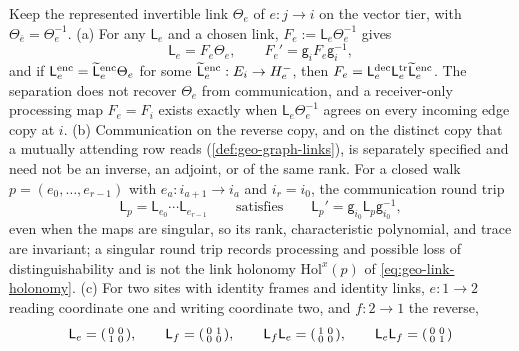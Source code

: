 Keep the represented invertible link \(\Theta_e\) of \(e:j\to i\) on the vector
tier, with \(\Theta_{\bar e}=\Theta_e^{-1}\). (a) For any \(\mathsf L_e\) and a
chosen link, \(F_e:=\mathsf L_e\Theta_e^{-1}\) gives
\begin{equation}
\mathsf L_e=F_e\Theta_e,
\qquad
F_e'=\mathsf g_iF_e\mathsf g_i^{-1},
\label{eq:geo-selective-processing-connection}
\end{equation}
and if \(\mathsf L^{\rm enc}_e=\widetilde{\mathsf L}^{\rm enc}_e\Theta_e\) for
some \(\widetilde{\mathsf L}^{\rm enc}_e:E_i\to H_e^-\), then
\(F_e=\mathsf L^{\rm dec}_e\mathsf L^{\rm tr}_e\widetilde{\mathsf L}^{\rm enc}_e\).
The separation does not recover \(\Theta_e\) from communication, and a
receiver-only processing map \(F_e=F_i\) exists exactly when
\(\mathsf L_e\Theta_e^{-1}\) agrees on every incoming edge copy at \(i\). (b)
Communication on the reverse copy, and on the distinct copy that a mutually
attending row reads (\cref{def:geo-graph-links}), is separately specified and
need not be an inverse, an adjoint, or of the same rank. For a closed walk
\(p=(e_0,\ldots,e_{r-1})\) with \(e_a:i_{a+1}\to i_a\) and \(i_r=i_0\), the
communication round trip
\begin{equation}
\mathsf L_p=\mathsf L_{e_0}\cdots\mathsf L_{e_{r-1}}
\qquad\text{satisfies}\qquad
\mathsf L_p'=\mathsf g_{i_0}\mathsf L_p\mathsf g_{i_0}^{-1},
\label{eq:geo-selective-loop}
\end{equation}
even when the maps are singular, so its rank, characteristic polynomial, and
trace are invariant; a singular round trip records processing and possible
loss of distinguishability and is not the link holonomy
\(\mathrm{Hol}^x(p)\) of \eqref{eq:geo-link-holonomy}. (c) For two sites with
identity frames and identity links, \(e:1\to2\) reading coordinate one and
writing coordinate two, and \(f:2\to1\) the reverse,
\begin{equation}
\mathsf L_e=\begin{psmallmatrix}0&0\\1&0\end{psmallmatrix},\qquad
\mathsf L_f=\begin{psmallmatrix}0&1\\0&0\end{psmallmatrix},\qquad
\mathsf L_f\mathsf L_e=\begin{psmallmatrix}1&0\\0&0\end{psmallmatrix},\qquad
\mathsf L_e\mathsf L_f=\begin{psmallmatrix}0&0\\0&1\end{psmallmatrix}
\label{eq:geo-selective-two-site-example}
\end{equation}
